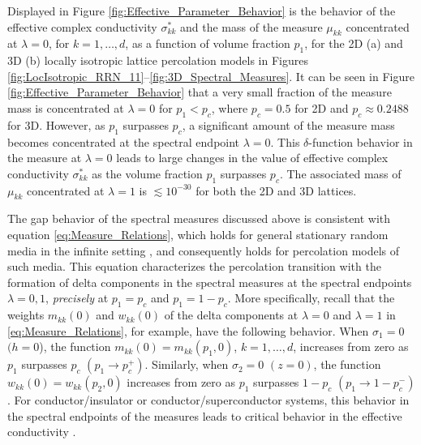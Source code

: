 \documentclass{cmslatex}
\begin{document}
Displayed in Figure \ref{fig:Effective_Parameter_Behavior} is the
behavior of the effective complex conductivity $\sigma^*_{kk}$ and the
mass of the measure $\mu_{kk}$ concentrated at $\lambda=0$, for $k=1,\ldots,d$, as
a function of volume fraction $p_1$, for the 2D (a) and 3D (b) locally
isotropic lattice percolation models in Figures
\ref{fig:LocIsotropic_RRN_11}--\ref{fig:3D_Spectral_Measures}. 
It can be seen in Figure \ref{fig:Effective_Parameter_Behavior} that a
very small fraction of the 
measure mass is concentrated at $\lambda=0$ for $p_1<p_c$, where $p_c=0.5$
for 2D and $p_c\approx0.2488$ for 3D. However, as $p_1$ surpasses $p_c$, a
significant amount of the measure mass becomes concentrated at the
spectral endpoint $\lambda=0$. This $\delta$-function behavior in the measure at
$\lambda=0$ leads to large changes in the value of effective complex
conductivity $\sigma^*_{kk}$ as the volume fraction $p_1$ surpasses
$p_c$. The associated mass of $\mu_{kk}$ concentrated at $\lambda=1$ is
$\lesssim10^{-30}$ for both the 2D and 3D lattices.  










The gap behavior of the spectral measures discussed above is
consistent with equation \eqref{eq:Measure_Relations}, which holds for
general stationary random media in the infinite setting
\cite{Murphy:JMP:063506}, and consequently holds for percolation
models of such media. This equation characterizes the percolation
transition with the formation of delta components in the spectral
measures at the spectral endpoints $\lambda=0,1$, \emph{precisely} at
$p_1=p_c$ and $p_1=1-p_c$. More specifically, recall that the weights
$m_{kk}(0)$ and $w_{kk}(0)$ of the delta components at $\lambda=0$ and $\lambda=1$ in
\eqref{eq:Measure_Relations}, for example, have the following
behavior. When $\sigma_1=0$ $(h=0$), the function
$m_{kk}(0)=m_{kk}(p_1,0)$, $k=1,\ldots,d$, increases from zero as 
$p_1$ surpasses $p_c$ $(p_1\to p_c^+)$. Similarly, when $\sigma_2=0$
$(z=0)$, the function $w_{kk}(0)=w_{kk}(p_2,0)$ increases from zero as
$p_1$ surpasses $1-p_c$ $(p_1\to1-p_c^-)$. For conductor/insulator or
conductor/superconductor systems, this behavior in the spectral
endpoints of the measures leads to critical behavior in the effective
conductivity \cite{Murphy:JMP:063506,Golden:JMP-5627}. 
\end{document}
